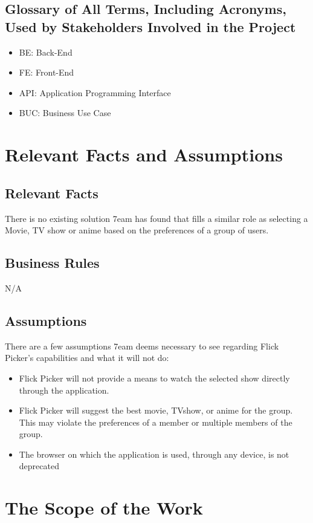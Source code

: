 \documentclass[12pt]{article}
\begin{document}
\subsection{Glossary of All Terms, Including Acronyms, Used by Stakeholders Involved in the Project}
\begin{itemize}
	\item BE: Back-End
	\item FE: Front-End
	\item API: Application Programming Interface
	\item BUC: Business Use Case
\end{itemize}

\section{Relevant Facts and Assumptions}

\subsection{Relevant Facts}
There is no existing solution 7eam has found that fills a similar role as selecting a Movie, TV show or anime based on the preferences of a group of users.


\subsection{Business Rules}
N/A

\subsection{Assumptions}
There are a few assumptions 7eam deems necessary to see regarding Flick Picker's capabilities and what it will not do:
\begin{itemize}
	\item Flick Picker will not provide a means to watch the selected show directly through the application.
	\item Flick Picker will suggest the best movie, TVshow, or anime for the group. This may violate the preferences of a member or multiple members of the group.
	\item The browser on which the application is used, through any device, is not deprecated
\end{itemize}

\section{The Scope of the Work}
\end{document}
